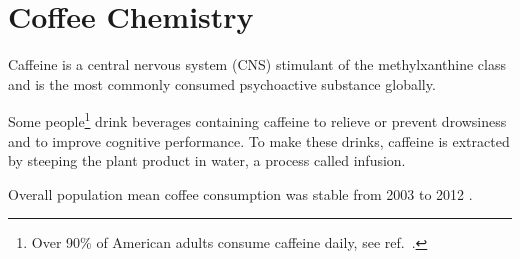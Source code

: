 \chapter{Coffee Chemistry}

Caffeine is a central nervous system (CNS) stimulant of the
methylxanthine class and is the most commonly consumed psychoactive substance
globally.

Some people\footnote{Over 90\% of American adults consume caffeine daily, see ref.~.}
drink beverages containing caffeine to relieve or prevent drowsiness and to
improve cognitive performance. To make these drinks, caffeine is extracted by
steeping the plant product in water, a process called infusion.

Overall population mean coffee consumption was stable from 2003 to 2012
\cite{LOFTFIELD20161762}.